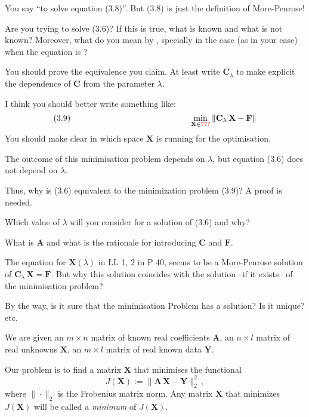 \begin{description}[style=unboxed,leftmargin=0cm,itemsep=3ex]
You say ``to solve equation (3.8)''.
But (3.8) is just the definition of More-Penrose!

Are you trying to solve (3.6)?
If this is true, what is known and what is not known?
Moreover, what do you mean by , specially in the
case (as in your case) when the equation is ?

You should prove the equivalence you claim.
At least write $\mathbf{C}_\lambda$ to make explicit the dependence of
$\mathbf{C}$ from the parameter $\lambda$.

I think you should better write something like:
$$
(3.9)\rule{50mm}{0pt} \min_{\mathbf X \in \text{\red{???}}}
\|\mathbf{C}_\lambda\,\mathbf{X}-\mathbf{F}\|
$$
You should make clear in which space $\mathbf{X}$ is running for the
optimisation.

The outcome of this minimisation problem depends on $\lambda$, but
equation (3.6) does not depend on $\lambda$.

Thus, why is (3.6) equivalent to the minimization problem (3.9)?
A proof is needed.

Which value of $\lambda$ will you consider for a solution of (3.6) and why?

What is $\mathbf{A}$ and what is the rationale for introducing $\mathbf{C}$
and $\mathbf{F}$.

The equation for $\mathbf{X}(\lambda)$ in LL 1, 2 in P 40, seems to be a
More-Penrose solution of $\mathbf{C}_\lambda\,\mathbf{X}=\mathbf{F}$.
But why this solution coincides with the solution --if it exists-- of the
minimisation problem?

By the way, is it sure that the minimisation Problem has a solution?
Is it unique? etc.

\vspace{3ex}
We are given
an $m\times n$ matrix of known real coefficients $\mathbf{A}$,
an $n\times l$ matrix of real unknowns $\mathbf{X}$,
an $m\times l$ matrix of real known data $\mathbf{Y}$.

Our problem is to find a matrix $\mathbf{X}$ that minimises the functional
\begin{equation}
J(\mathbf{X}):=\|\mathbf{A}\,\mathbf{X}-\mathbf{Y}\|_2^2\,,
\end{equation}
where $\|\cdot\|_2$ is the Frobenius matrix norm.
Any matrix $\mathbf{X}$ that minimizes $J(\mathbf{X})$ will be called a
{\em minimum\/} of $J(\mathbf{X})$.


\end{description}
